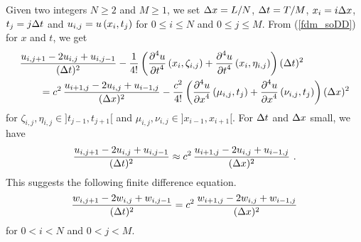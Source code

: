Given two integers $N\geq 2$ and $M\geq 1$, we set $\Delta{x} = L/N$,
$\Delta{t} = T/M$, $x_i = i \Delta{x}$, $t_j = j \Delta{t}$ and
$\displaystyle u_{i,j} = u\left(x_i,t_j\right)$
for $0\leq i \leq N$ and $0\leq j \leq M$.
From (\ref{fdm_soDD}) for $x$ and $t$, we get
\begin{equation} \label{fdm_sch3_tr}
\begin{split} 
&\frac{u_{i,j+1} - 2u_{i,j} + u_{i,j-1}}{(\Delta{t})^2}
- \frac{1}{4!} \left( \frac{\displaystyle \partial^{4}{u}} {\displaystyle \partial{t}^{4}}\left(x_i,\zeta_{i,j} \right)
+ \frac{\displaystyle \partial^{4}{u}} {\displaystyle \partial{t}^{4}}\left(x_i,\eta_{i,j} \right) \right) (\Delta{t})^2 \\
&\qquad = c^2 \, \frac{u_{i+1,j} - 2u_{i,j} + u_{i-1,j}}{(\Delta{x})^2}
- \frac{c^2}{4!} \left( \frac{\displaystyle \partial^{4}{u}} {\displaystyle \partial{x}^{4}}\left(\mu_{i,j},t_j\right)
+ \frac{\displaystyle \partial^{4}{u}} {\displaystyle \partial{x}^{4}}\left(\nu_{i,j},t_j\right) \right) (\Delta{x})^2
\end{split}
\end{equation}
for $\zeta_{i,j}, \eta_{i,j} \in ]t_{j-1},t_{j+1}[$ and
$\mu_{i,j}, \nu_{i,j} \in ]x_{i-1},x_{i+1}[$.
For $\Delta{t}$ and $\Delta{x}$ small, we have
\[
\frac{u_{i,j+1} - 2u_{i,j} + u_{i,j-1}}{(\Delta{t})^2} \approx c^2 \,
\frac{u_{i+1,j} - 2u_{i,j} + u_{i-1,j}}{(\Delta{x})^2} \ .
\]
This suggests the following finite difference equation.
\begin{equation} \label{fdm_sch3}
\frac{w_{i,j+1} - 2w_{i,j} + w_{i,j-1}}{(\Delta{t})^2} = c^2 \,
\frac{w_{i+1,j} - 2w_{i,j} + w_{i-1,j}}{(\Delta{x})^2}
\end{equation}
for $0 < i <N$ and $0 < j < M$.

